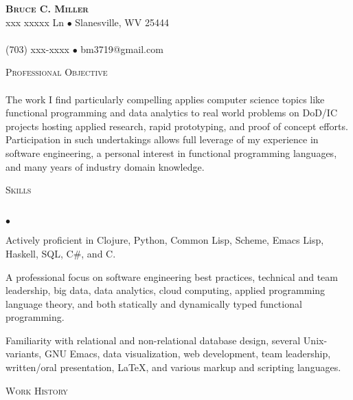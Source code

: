 \documentclass{article}
\newcommand{\lineunder}{\vspace*{-8pt} \\ \hspace*{-18pt} \hrulefill \\}
\newcommand{\header}[1]{{\hspace*{-15pt}\vspace*{7pt} \textsc{#1}} \vspace*{-7pt} \lineunder}
\newcommand{\contact}[3]{
\vspace*{-8pt}
\begin{center}
{\LARGE \scshape {#1}}\\
#2 \lineunder
#3
\end{center}
\vspace*{-8pt}
}
\newenvironment{achievements}{\begin{list}{$\bullet$}{\topsep 0pt \itemsep
      -2pt}}{\vspace*{4pt}\end{list}}
\begin{document}
\small
\smallskip
\vspace*{-44pt}

\contact{\textbf{Bruce C. Miller}}
{xxx xxxxx Ln $\bullet$ Slanesville, WV 25444}
{(703) xxx-xxxx $\bullet$ bm3719@gmail.com}

\header{Professional Objective} The work I find particularly compelling applies
computer science topics like functional programming and data analytics to real
world problems on DoD/IC projects hosting applied research, rapid prototyping,
and proof of concept efforts.  Participation in such undertakings allows full
leverage of my experience in software engineering, a personal interest in
functional programming languages, and many years of industry domain knowledge.
\vspace{7pt}

\header{Skills}
\begin{achievements}
\item Actively proficient in Clojure, Python, Common Lisp, Scheme, Emacs Lisp,
  Haskell, SQL, C\#, and C.
\item A professional focus on software engineering best practices, technical
  and team leadership, big data, data analytics, cloud computing, applied
  programming language theory, and both statically and dynamically typed
  functional programming.
\item Familiarity with relational and non-relational database design, several
  Unix-variants, GNU Emacs, data visualization, web development, team
  leadership, written/oral presentation, \LaTeX, and various markup and
  scripting languages.
\end{achievements}

\header{Work History}
\end{document}
